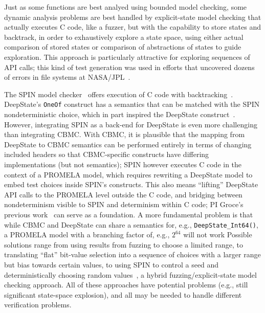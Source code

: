 Just as some functions are best analyed using bounded model checking, some dynamic analysis problems are best handled by explicit-state model checking that actually executes C code, like a fuzzer, but with the capability to store states and backtrack, in order to exhaustively explore a state space, using either actual comparison of stored states or comparison of abstractions of states to guide exploration.  This approach is particularly attractive for exploring sequences of API calls; this kind of test generation was used in efforts that uncovered dozens of errors in file systems at NASA/JPL~\cite{AMAI}.

The SPIN model checker~\cite{SPIN} offers execution of C code with backtracking~\cite{ModelDriven,ModelCode}.  DeepState's {\tt OneOf} construct has a semantics that can be matched with the SPIN nondeterministic choice, which in part inspired the DeepState construct~\cite{WODA08,WODACommon}.  However, integrating SPIN as a back-end for DeepState is even more challenging than integrating CBMC.  With CBMC, it is plausible that the mapping from DeepState to CBMC semantics can be performed entirely in terms of changing included headers so that CBMC-specific constructs have differing implementations (but not semantics); SPIN however executes C code in the context of a PROMELA model, which requires rewriting a DeepState model to embed test choices inside SPIN's constructs.  This also means ``lifting'' DeepState API calls to the PROMELA level outside the C code, and bridging between nondeterminism visible to SPIN and determinism within C code; PI Groce's previous work~\cite{WODA08} can serve as a foundation.  A more fundamental problem is that while CBMC and DeepState can share a semantics for, e.g., {\tt DeepState\_Int64()}, a PROMELA model with a branching factor of, e.g., $2^{64}$ will not work  Possible solutions range from using results from fuzzing to choose a limited range, to translating ``flat'' bit-value selection into a sequence of choices with a larger range but bias towards certain values, to using SPIN to control a seed and deterministically choosing random values~\cite{WODA08}, a hybrid fuzzing/explicit-state model checking approach.  All of these approaches have potential problems (e.g., still significant state-space explosion), and all may be needed to handle different verification problems.